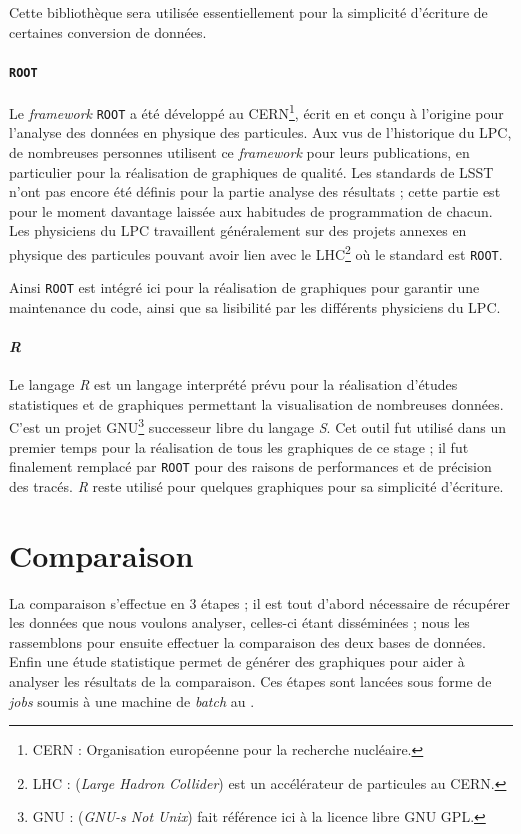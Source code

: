 Cette bibliothèque sera utilisée essentiellement pour la simplicité d'écriture de certaines conversion de données.

			\paragraph{\texttt{ROOT}}
Le \emph{framework} \texttt{ROOT} a été développé au CERN\footnote{CERN : Organisation européenne pour la recherche nucléaire.}, écrit en \Cpp{} et conçu à l'origine pour l'analyse des données en physique des particules. Aux vus de l'historique du LPC, de nombreuses personnes utilisent ce \emph{framework} pour leurs publications, en particulier pour la réalisation de graphiques de qualité. Les standards de LSST n'ont pas encore été définis pour la partie analyse des résultats ; cette partie est pour le moment davantage laissée aux habitudes de programmation de chacun. Les physiciens du LPC travaillent généralement sur des projets annexes en physique des particules pouvant avoir lien avec le LHC\footnote{LHC : (\emph{Large Hadron Collider}) est un accélérateur de particules au CERN.} où le standard est \texttt{ROOT}.

Ainsi \texttt{ROOT} est intégré ici pour la réalisation de graphiques pour garantir une maintenance du code, ainsi que sa lisibilité par les différents physiciens du LPC.

			\paragraph{\emph{R}}
Le langage \emph{R} est un langage interprété prévu pour la réalisation d'études statistiques et de graphiques permettant la visualisation de nombreuses données. C'est un projet GNU\footnote{GNU : (\emph{GNU-s Not Unix}) fait référence ici à la licence libre GNU GPL.} successeur libre du langage \emph{S}. Cet outil fut utilisé dans un premier temps pour la réalisation de tous les graphiques de ce stage ; il fut finalement remplacé par \texttt{ROOT} pour des raisons de performances et de précision des tracés. \emph{R} reste utilisé pour quelques graphiques pour sa simplicité d'écriture.


\section{Comparaison}

La comparaison s'effectue en 3 étapes ; il est tout d'abord nécessaire de récupérer les données que nous voulons analyser, celles-ci étant disséminées ; nous les rassemblons pour ensuite effectuer la comparaison des deux bases de données. Enfin une étude statistique permet de générer des graphiques pour aider à analyser les résultats de la comparaison. Ces étapes sont lancées sous forme de \emph{jobs} soumis à une machine de \emph{batch} au \CC.

